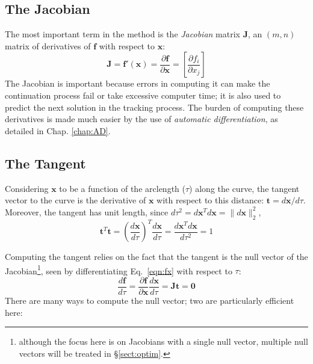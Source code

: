 \documentclass[10pt,openany,twoside]{book}
\numberwithin{equation}{section}   %
\newcommand{\Matrix}[1]{\boldsymbol{#1}}
\newcommand{\Vector}[1]{\boldsymbol{#1}}
\newcommand{\Sectref}[1]{\S\ref{#1}}
\newcommand{\Chapref}[1]{Chap. \ref{#1}}
\newcommand{\Eqn}[1]{Eq.\ \ref{#1}}
\begin{document}
\subsection{The Jacobian}
The most important term in the method is the \emph{Jacobian} matrix
$\Matrix{J}$, an $(m,n)$ matrix of derivatives of $\Vector{f}$ with
respect to $\Vector{x}$:
\begin{equation}\label{eqn:jacobian}
	\Matrix{J} = \Vector{f}'(\Vector{x}) =
		\frac{\partial \Vector{f}}{\partial \Vector{x}} =
		\left[\frac{\partial f_i}{\partial x_j}\right]
\end{equation}
The Jacobian is important because errors in computing it can make the
continuation process fail or take excessive computer time;
it is also used to predict the next solution in the tracking process.
The burden of computing these derivatives is made much easier by the use of
\emph{automatic differentiation},
as detailed in \Chapref{chap:AD}.

\subsection{The Tangent}\label{sect:the-tangent}
Considering $\Vector{x}$ to be a function of the arclength ($\tau$) along the
curve, the tangent vector to the curve is the derivative of $\Vector{x}$
with respect to this distance: $\Vector{t} = d\Vector{x}/d\tau$.
Moreover, the tangent has unit length, since
	$d\tau^2 = d\Vector{x}^T d\Vector{x} = \|d\Vector{x}\|_2^2$,
\begin{displaymath}
\Vector{t}^T\Vector{t} =
	\left(\frac{d\Vector{x}}{d\tau}\right)^T \frac{d\Vector{x}}{d\tau}
	= \frac{d\Vector{x}^T d\Vector{x}}{d\tau^2} = 1
\end{displaymath}

Computing the tangent relies on the fact that the tangent is the null
vector of the Jacobian\footnote{although the focus here is on Jacobians with a single
null vector, multiple null vectors will be treated in \Sectref{sect:optim}.},
seen by differentiating \Eqn{eqn:fx} with respect to $\tau$:
\begin{equation}\label{eqn:Jt}
	\frac{d\Vector{f}}{d\tau} = \frac{\partial\Vector{f}}{\partial\Vector{x}}\frac{d\Vector{x}}{d\tau}
		= \Vector{Jt} = \Vector{0}
\end{equation}
There are many ways to compute the null vector; two are particularly efficient here:
\end{document}
